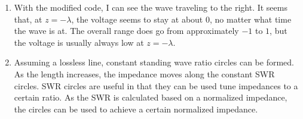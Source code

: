\begin{enumerate}
\begin{multicols}{2}
    \end{multicols}

  \item With the modified code, I can see the wave traveling to the right. It seems that, at $z=-\lambda$, the voltage seems to stay at about 0, no matter what time the wave is at. The overall range does go from approximately $-1$ to $1$, but the voltage is usually always low at $z=-\lambda$.

  \item Assuming a lossless line, constant standing wave ratio circles can be formed. As the length increases, the impedance moves along the constant SWR circles. SWR circles are useful in that they can be used tune impedances to a certain ratio. As the SWR is calculated based on a normalized impedance, the circles can be used to achieve a certain normalized impedance.

\end{enumerate}



